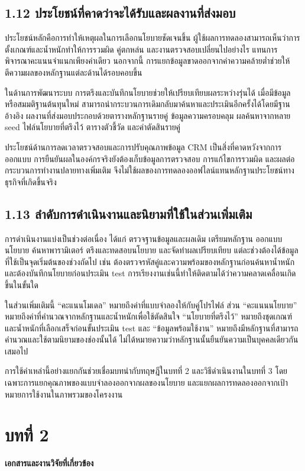\documentclass[12pt,a4paper]{report}
\begin{document}
\section*{1.12 ประโยชน์ที่คาดว่าจะได้รับและผลงานที่ส่งมอบ}
ประโยชน์หลักคือการทำให้เหตุผลในการเลือกนโยบายชัดเจนขึ้น ผู้ใช้ผลการทดลองสามารถเห็นว่าการตั้งเกณฑ์และน้ำหนักทำให้การรวมผิด คู่ตกหล่น และงานตรวจสอบเปลี่ยนไปอย่างไร แทนการพิจารณาคะแนนจำแนกเพียงค่าเดียว นอกจากนี้ การแยกข้อมูลขาดออกจากค่าความคล้ายต่ำช่วยให้ตีความผลของหลักฐานแต่ละด้านได้รอบคอบขึ้น

ในด้านการพัฒนาระบบ การตรึงและบันทึกนโยบายช่วยให้เปรียบเทียบผลระหว่างรุ่นได้ เมื่อมีข้อมูลหรือสมมติฐานต้นทุนใหม่ สามารถนำกระบวนการเดิมกลับมาค้นหาและประเมินอีกครั้งได้โดยมีฐานอ้างอิง ผลงานที่ส่งมอบประกอบด้วยตารางหลักฐานรายคู่ ข้อมูลความครอบคลุม ผลค้นหาจากหลาย seed ไฟล์นโยบายที่ตรึงไว้ ตารางตัวชี้วัด และคำตัดสินรายคู่

ประโยชน์ด้านการลดเวลาตรวจสอบและการปรับคุณภาพข้อมูล CRM เป็นสิ่งที่คาดหวังจากการออกแบบ การยืนยันผลในองค์กรจริงยังต้องเก็บข้อมูลการตรวจสอบ การแก้ไขการรวมผิด และผลต่อกระบวนการทำงานปลายทางเพิ่มเติม จึงไม่ใช้ผลของการทดลองออฟไลน์แทนหลักฐานประโยชน์ทางธุรกิจที่เกิดขึ้นจริง

\section*{1.13 ลำดับการดำเนินงานและนิยามที่ใช้ในส่วนเพิ่มเติม}
การดำเนินงานแบ่งเป็นช่วงต่อเนื่อง ได้แก่ ตรวจฐานข้อมูลและผลเดิม เตรียมหลักฐาน ออกแบบนโยบาย ค้นหาพารามิเตอร์ ตรึงและทดสอบนโยบาย และจัดทำผลเปรียบเทียบ แต่ละช่วงต้องได้ข้อมูลที่ใช้เป็นจุดเริ่มต้นของช่วงถัดไป เช่น ต้องตรวจรหัสคู่และความพร้อมของหลักฐานก่อนค้นหาน้ำหนัก และต้องบันทึกนโยบายก่อนประเมิน test การเรียงงานเช่นนี้ทำให้ติดตามได้ว่าความคลาดเคลื่อนเกิดขึ้นในขั้นใด

ในส่วนเพิ่มเติมนี้ ``คะแนนโมเดล'' หมายถึงค่าที่แบบจำลองให้กับคู่โปรไฟล์ ส่วน ``คะแนนนโยบาย'' หมายถึงค่าที่คำนวณจากหลักฐานและน้ำหนักเพื่อใช้ตัดสินใจ ``นโยบายที่ตรึงไว้'' หมายถึงชุดเกณฑ์และน้ำหนักที่เลือกเสร็จก่อนขั้นประเมิน test และ ``ข้อมูลพร้อมใช้งาน'' หมายถึงมีหลักฐานที่สามารถคำนวณและใช้ตามนิยามของช่องนั้นได้ ไม่ได้หมายความว่าหลักฐานนั้นยืนยันความเป็นบุคคลเดียวกันเสมอไป

การใช้คำเหล่านี้อย่างแยกกันช่วยเชื่อมบทนำกับทฤษฎีในบทที่ 2 และวิธีดำเนินงานในบทที่ 3 โดยเฉพาะการแยกคุณภาพของแบบจำลองออกจากผลของนโยบาย และแยกผลการทดลองออกจากเป้าหมายการใช้งานในภาพรวมของโครงงาน

\clearpage
\chapter*{บทที่ 2}
\begin{center}\Large\bfseries เอกสารและงานวิจัยที่เกี่ยวข้อง\end{center}
\end{document}
